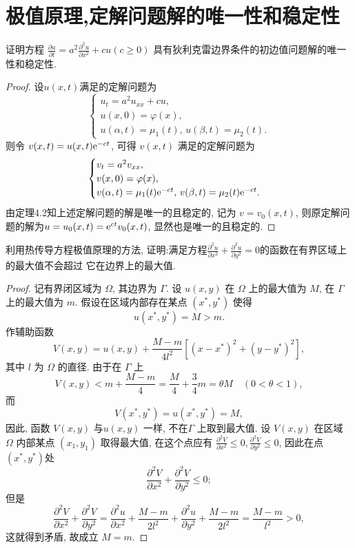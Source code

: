 \section{极值原理,定解问题解的唯一性和稳定性}

\begin{exercise}
  证明方程 $\displaystyle\frac{\partial u}{\partial t} = a^2 \frac{\partial^2 u}{\partial x^2} + cu (c\geq 0)$ 具有狄利克雷边界条件的初边值问题解的唯一性和稳定性.
\end{exercise}

\begin{proof}
  设$u(x,t)$满足的定解问题为
  \[\begin{cases}
    u_t = a^2 u_{xx} + cu, \\
    u(x,0) = \varphi(x), \\
    u(\alpha,t) = \mu_1(t),\,u(\beta,t)=\mu_2(t).
  \end{cases}\]
  则令 $v(x,t)=u(x,t) \mathrm{e}^{-ct}$, 可得 $v(x,t)$ 满足的定解问题为
  \[\begin{cases}
    v_t = a^2v_{xx}, \\
    v(x,0) = \varphi(x), \\
    v(\alpha,t) = \mu_1(t)\mathrm{e}^{-ct},\,v(\beta,t) = \mu_2(t)\mathrm{e}^{-ct}.
  \end{cases}\]
  由定理4.2知上述定解问题的解是唯一的且稳定的,
  记为 $v=v_0(x,t)$, 则原定解问题的解为$u = u_0(x,t) = \mathrm{e}^{ct}v_0(x,t)$, 显然也是唯一的且稳定的.
\end{proof}


\begin{exercise}
  利用热传导方程极值原理的方法, 证明:满足方程$\displaystyle \frac{\partial^2 u}{\partial x^2}+\frac{\partial^2 u}{\partial y^2}=0$的函数在有界区域上的最大值不会超过
  它在边界上的最大值.
\end{exercise}

\begin{proof}
  记有界闭区域为 $\varOmega$, 其边界为 $\varGamma$.
  设 $u(x,y)$ 在 $\varOmega$ 上的最大值为 $M$, 在 $\varGamma$ 上的最大值为 $m$.
  假设在区域内部存在某点 $(x^*,y^*)$ 使得
  \[u(x^*,y^*) = M > m.\]
  作辅助函数
  \[V(x,y) = u(x,y)+\frac{M-m}{4l^2}\left[(x-x^*)^2+(y-y^*)^2\right],\]
  其中 $l$ 为 $\varOmega$ 的直径. 由于在 $\varGamma$ 上
  \[V(x,y) < m+\frac{M-m}{4}=\frac M4+\frac 34m=\theta M\quad (0<\theta<1),\]
  而
  \[V(x^*,y^*)=u(x^*,y^*)=M,\]
  因此, 函数 $V(x,y)$ 与$u(x,y)$ 一样, 不在$\varGamma$ 上取到最大值. 设 $V(x,y)$ 在区域 $\varOmega$ 内部某点 $(x_1,y_1)$ 取得最大值, 在这个点应有 $\displaystyle\frac{\partial^2 V}{\partial x^2}\leq0, \frac{\partial^2 V}{\partial y^2}\leq0$, 因此在点$(x^*,y^*)$处
  \[\frac{\partial^2 V}{\partial x^2}+\frac{\partial^2 V}{\partial y^2}\leq0;\]
  但是
  \[\frac{\partial^2 V}{\partial x^2}+\frac{\partial^2 V}{\partial y^2}=\frac{\partial^2 u}{\partial x^2}+\frac{M-m}{2l^2}+\frac{\partial^2 u}{\partial y^2}+\frac{M-m}{2l^2}=\frac{M-m}{l^2}>0,\]
  这就得到矛盾, 故成立 $M=m$.
\end{proof}


